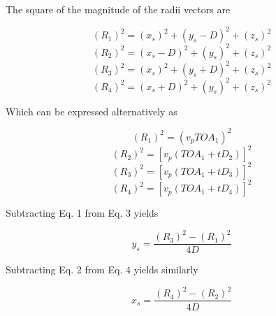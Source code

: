 \documentclass[12pt]{article}
\begin{document}
\pagebreak
\noindent The square of the magnitude of the radii vectors are

\begin{center}
\begin{equation} \label{eq:1}
(R_1)^2 = (x_s)^2 + (y_s-D)^2 + (z_s)^2
\end{equation}
\begin{equation} \label{eq:2}
(R_2)^2 = (x_s-D)^2 + (y_s)^2 + (z_s)^2
\end{equation}
\begin{equation} \label{eq:3}
(R_3)^2 = (x_s)^2 + (y_s+D)^2 + (z_s)^2
\end{equation}
\begin{equation} \label{eq:4}
(R_4)^2 = (x_s+D)^2 + (y_s)^2 + (z_s)^2
\end{equation}
\end{center}

\vspace{4 mm}
\noindent Which can be expressed alternatively as\\

\begin{center}
\begin{equation} \label{eq:5}
(R_1)^2 = (v_p TOA_1)^2
\end{equation}
\begin{equation} \label{eq:6}
(R_2)^2 = [v_p (TOA_1 + tD_2)]^2
\end{equation}
\begin{equation} \label{eq:7}
(R_3)^2 = [v_p (TOA_1 + tD_3)]^2
\end{equation}
\begin{equation} \label{eq:8}
(R_4)^2 = [v_p (TOA_1 + tD_4)]^2
\end{equation}
\end{center}

\vspace{5 mm}
\noindent Subtracting Eq. 1 from Eq. 3 yields
\begin{center}
\begin{equation} \label{eq:10}
y_s = \frac{(R_3)^2 - (R_1)^2}{4D}
\end{equation}
\end{center}

\pagebreak
\noindent Subtracting Eq. 2 from Eq. 4 yields similarly
\begin{center}
\begin{equation} \label{eq:11}
x_s = \frac{(R_4)^2 - (R_2)^2}{4D}
\end{equation}
\end{center}
\end{document}
